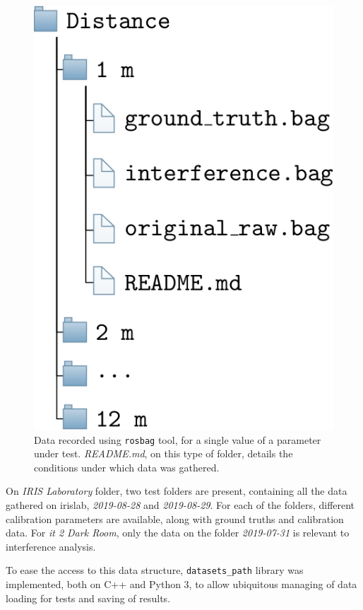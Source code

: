 \begin{figure}[H]
\centering
\includegraphics[scale=0.3]{img/datasets/parameter-test-files.png}
\caption{Data recorded using \texttt{rosbag} tool, for a single value of a parameter under test. \textit{README.md}, on this type of folder, details the conditions under which data was gathered.}
\label{fig:parameter-test-files}
\end{figure}


On \textit{IRIS Laboratory} folder, two test folders are present, containing all the data gathered on \ac{irislab}, \textit{2019-08-28} and \textit{2019-08-29}. For each of the folders, different calibration parameters are available, along with ground truths and calibration data. For \textit{\ac{it} 2 Dark Room}, only the data on the folder \textit{2019-07-31} is relevant to interference analysis.

To ease the access to this data structure, \texttt{datasets\_path} library was implemented, both on C++ and Python 3, to allow ubiquitous managing of data loading for tests and saving of results.


